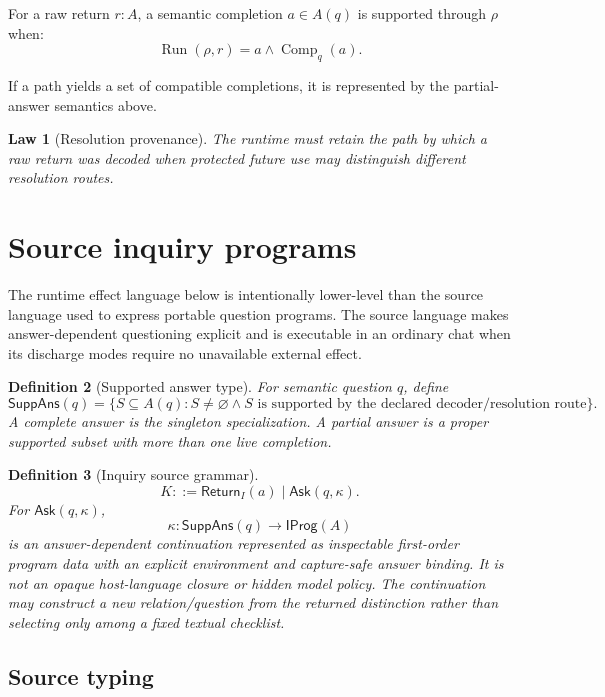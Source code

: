 \documentclass[11pt,oneside]{article}
\newtheorem{definition}{Definition}[section]
\newtheorem{law}[definition]{Law}
\newcommand{\Comp}{\operatorname{Comp}}
\begin{document}
For a raw return \(r:A\), a semantic completion \(a\in A(q)\) is supported through \(\rho\) when:
\[
\boxed{
\operatorname{Run}(\rho,r)=a
\land
\Comp_q(a).
}
\]

If a path yields a set of compatible completions, it is represented by the partial-answer semantics above.

\begin{law}[Resolution provenance]
The runtime must retain the path by which a raw return was decoded when protected future use may distinguish different resolution routes.
\end{law}


\section{Source inquiry programs}

The runtime effect language below is intentionally lower-level than the source language used to express portable question programs.  The source language makes answer-dependent questioning explicit and is executable in an ordinary chat when its discharge modes require no unavailable external effect.

\begin{definition}[Supported answer type]
For semantic question \(q\), define
\[
\boxed{
\mathsf{SuppAns}(q)
=
\{S\subseteq A(q):S\neq\varnothing\land S\text{ is supported by the declared decoder/resolution route}\}.
}
\]
A complete answer is the singleton specialization.  A partial answer is a proper supported subset with more than one live completion.
\end{definition}

\begin{definition}[Inquiry source grammar]
\[
\boxed{
K::=
\mathsf{Return}_I(a)
\mid
\mathsf{Ask}(q,\kappa).
}
\]
For \(\mathsf{Ask}(q,\kappa)\),
\[
\kappa:\mathsf{SuppAns}(q)\to\mathsf{IProg}(A)
\]
is an answer-dependent continuation represented as inspectable first-order program data with an explicit environment and capture-safe answer binding.  It is not an opaque host-language closure or hidden model policy.  The continuation may construct a new relation/question from the returned distinction rather than selecting only among a fixed textual checklist.
\end{definition}

\subsection{Source typing}
\end{document}
